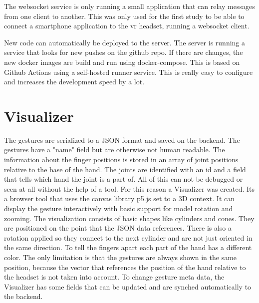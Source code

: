 The websocket service is only running a small application that can relay messages from one client to another. This was only used for the first study to be able to connect a smartphone application to the vr headset, running a websocket client.

New code can automatically be deployed to the server. The server is running a service that looks for new pushes on the github repo. If there are changes, the new docker images are build and run using docker-compose. This is based on Github Actions using a self-hosted runner service. This is really easy to configure and increases the development speed by a lot. 





\section{Visualizer}

The gestures are serialized to a JSON format and saved on the backend. The gestures have a "name" field but are otherwise not human readable. The information about the finger positions is stored in an array of joint positions relative to the base of the hand. The joints are identified with an id and a field that tells which hand the joint is a part of. All of this can not be debugged or seen at all without the help of a tool. For this reason a Visualizer was created. Its a browser tool that uses the canvas library p5.js set to a 3D context. It can display the gesture interactively with basic support for model rotation and zooming. The visualization consists of basic shapes like cylinders and cones. They are positioned on the point that the JSON data references. There is also a rotation applied so they connect to the next cylinder and are not just oriented in the same direction. To tell the fingers apart each part of the hand has a different color. The only limitation is that the gestures are always shown in the same position, because the vector that references the position of the hand relative to the headset is not taken into account. To change gesture meta data, the Visualizer has some fields that can be updated and are synched automatically to the backend.





